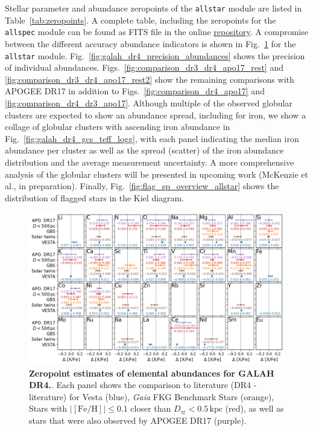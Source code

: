 \documentclass[
  journal=pasa,
  manuscript=research-paper, %
  year=2024,
  volume=37
]{cup-journal}
\newcommand{\Gaia}{\textit{Gaia}\xspace}
\begin{document}

Stellar parameter and abundance zeropoints of the \texttt{allstar} module are listed in Table~\ref{tab:zeropoints}. A complete table, including the zeropoints for the \texttt{allspec} module can be found as FITS file in the online \href{https://github.com/svenbuder/GALAH_DR4/blob/main/catalogs/galah_dr4_zeropoints_240705.fits}{repository}. A compromise between the different accuracy abundance indicators is shown in Fig.~\ref{fig:galah_dr4_zeropoint_checks_allstar} for the \texttt{allstar} module. Fig.~\ref{fig:galah_dr4_precision_abundances} shows the precision of individual abundances. Figs.~\ref{fig:comparison_dr3_dr4_apo17_rest} and \ref{fig:comparison_dr3_dr4_apo17_rest2} show the remaining comparisons with APOGEE DR17 in addition to Figs.~\ref{fig:comparison_dr4_apo17} and \ref{fig:comparison_dr4_dr3_apo17}.
Although multiple of the observed globular clusters are expected to show an abundance spread, including for iron, we show a collage of globular clusters with ascending iron abundance in Fig.~\ref{fig:galah_dr4_gcs_teff_logg}, with each panel indicating the median iron abundance per cluster as well as the spread (scatter) of the iron abundance distribution and the average measurement uncertainty. A more comprehensive analysis of the globular clusters will be presented in upcoming work (McKenzie et al., in preparation). Finally, Fig.~\ref{fig:flag_sp_overview_allstar} shows the distribution of flagged stars in the Kiel diagram.



\begin{figure}[ht]
 \centering
 \includegraphics[width=\textwidth]{figures/galah_dr4_zeropoint_checks_allstar.png}
 \caption{\textbf{Zeropoint estimates of elemental abundances for GALAH DR4.}. Each panel shows the comparison to literature (DR4 - literature) for Vesta (blue), \Gaia FKG Benchmark Stars (orange), Stars with $\vert \mathrm{[Fe/H]} \vert \leq 0.1$ closer than $D_\varpi < 0.5\,\mathrm{kpc}$ (red), as well as stars that were also observed by APOGEE DR17 (purple).}
 \label{fig:galah_dr4_zeropoint_checks_allstar}
\end{figure}
\end{document}
